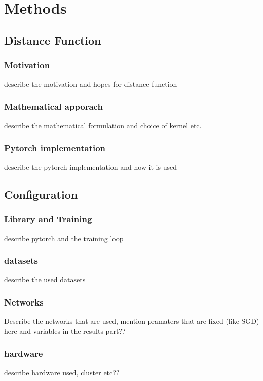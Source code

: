 \chapter{Methods}
\section{Distance Function}
\subsection{Motivation}
describe the motivation and hopes for distance function
\subsection{Mathematical apporach}
describe the mathematical formulation and choice of kernel etc.
\subsection{Pytorch implementation}
describe the pytorch implementation and how it is used

\section{Configuration}

\subsection{Library and Training}
describe pytorch and the training loop

\subsection{datasets}
describe the used datasets
\subsection{Networks}
Describe the networks that are used,
mention pramaters that are fixed (like SGD) here and variables in the results part??
\subsection{hardware}
describe hardware used, cluster etc??
